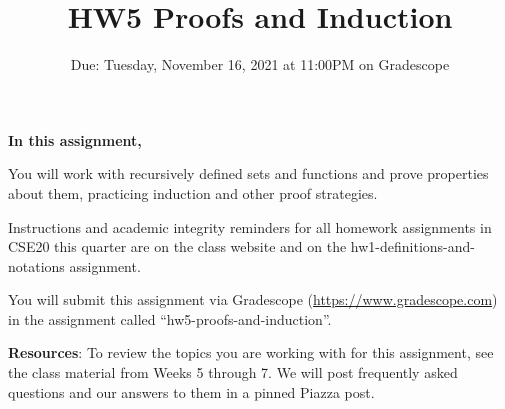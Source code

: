 

\title{HW5 Proofs and Induction}
\date{Due: Tuesday, November 16, 2021 at 11:00PM on Gradescope}


\maketitle
\thispagestyle{fancy}

{\bf In this assignment,}

You will work with recursively defined sets and functions and prove 
properties about them, practicing induction and other proof strategies.

Instructions and academic integrity reminders for all homework assignments in 
CSE20 this quarter are on the class website and on the hw1-definitions-and-notations
assignment.

You will submit this assignment via Gradescope
(\href{https://www.gradescope.com}{https://www.gradescope.com}) 
in the assignment called ``hw5-proofs-and-induction''.

{\bf Resources}: To review the topics you are working with 
for this assignment, see the class material from Weeks 5 through 7.
We will post frequently asked questions and our answers to them in a 
pinned Piazza post.


